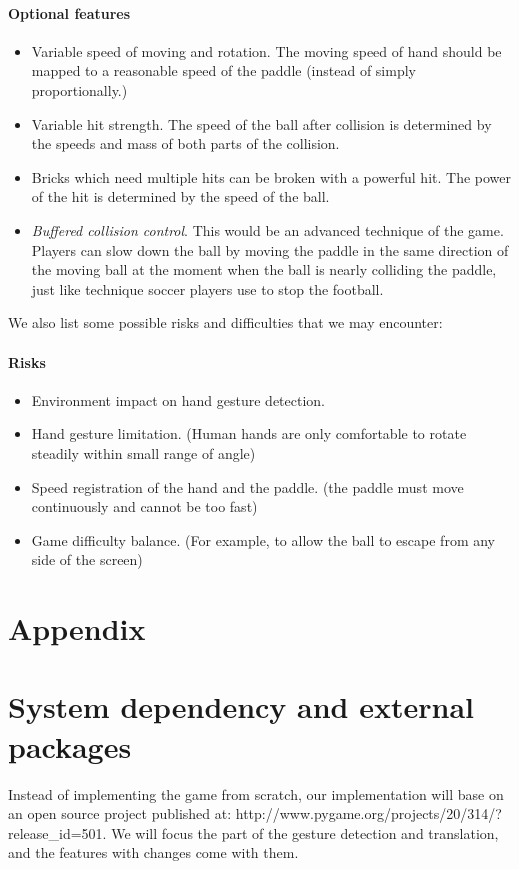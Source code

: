 \documentclass[10pt,twocolumn,letterpaper]{article}
\begin{document}
\paragraph{Optional features}
\begin{itemize}
	\item Variable speed of moving and rotation. The moving speed of hand should be mapped to a reasonable speed of the paddle (instead of simply proportionally.)
	\item Variable hit strength. The speed of the ball after collision is determined by the speeds and mass of both parts of the collision.
	\item Bricks which need multiple hits can be broken with a powerful hit. The power of the hit is determined by the speed of the ball.
	\item \emph{Buffered collision control}. This would be an advanced technique of the game. Players can slow down the ball by moving the paddle in the same direction of the moving ball at the moment when the ball is nearly colliding the paddle, just like technique soccer players use to stop the football. 
\end{itemize}

We also list some possible risks and difficulties that we may encounter:
\paragraph{Risks}
\begin{itemize}
	\item Environment impact on hand gesture detection.
	\item Hand gesture limitation. (Human hands are only comfortable to rotate steadily within small range of angle)
	\item Speed registration of the hand and the paddle. (the paddle must move continuously and cannot be too fast)
	\item Game difficulty balance. (For example, to allow the ball to escape from any side of the screen)
\end{itemize}
\section*{Appendix}
\appendix
\section{System dependency and external packages}
Instead of implementing the game from scratch, our implementation 
will base on an open source project published at: 
http://www.pygame.org/projects/20/314/?release\_id=501. We will 
focus the part of the gesture detection and translation, and the 
features with changes come with them.
\end{document}
